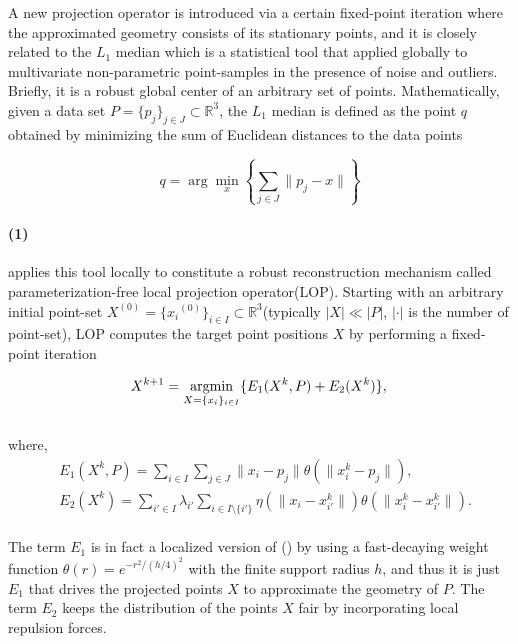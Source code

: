 A new projection operator is introduced via a certain fixed-point iteration where the approximated geometry consists of its stationary points,
and it is closely related to the $L_1$ median\cite{brown1983statistical,small1990survey} which is a statistical tool that applied globally to multivariate non-parametric point-samples in the presence of noise and outliers.
Briefly, it is a robust global center of an arbitrary set of points. Mathematically, given a data set $P=\{p_{j}\}_{j\in J}\subset \mathbb{R}^3$, the $L_1$ median is defined as the point $q$ obtained by minimizing the sum of Euclidean distances to the data points

\small{
\begin{equation}
 \label{eq:L1median}
 q=\arg\min_{x}\left\{ \sum_{j\in J}^{}\|p_{j}-x\| \right\}
\end{equation}
}

\paragraph{(1)}\cite{lipman2007parameterization} applies this tool locally to constitute a robust reconstruction mechanism called parameterization-free local projection operator(LOP). Starting with an arbitrary initial point-set $X^{(0)}=\{{x_{i}}^{(0)}\}_{i\in I}\subset \mathbb{R}^3$(typically $|X|\ll|P|$, $|\cdot|$ is the number of point-set), LOP computes the target point positions $X$ by performing a fixed-point iteration

\small{
\begin{equation}
 \label{eq:LOP1}
 X^{k+1}=\mathop{\operatorname*{argmin}}_{X=\{x_{i}\}_{i\in I}}\{E_1(X^{k},P)+E_2(X^{k})\},\\
\end{equation}
}
\\
where,
\small{
\begin{equation}
 \label{eq:LOP2}
 \begin{split}
 & E_1(X^{k},P)=\sum_{i\in I}^{}\sum_{j\in J}^{}\|x_{i}-p_{j}\|\theta(\|x{_i^k}-p_{j}\|),\\
 & E_2(X^{k})=\sum_{i'\in I}^{}\lambda_{i'}\sum_{i\in I\setminus\{i'\}}^{} \eta(\|x_{i}-x{_{i'}^k}\|)\theta(\|x{_i^k}-x{_{i'}^k}\|).
 \end{split}
\end{equation}
}
\\
The term $E_1$ is in fact a localized version of () by using a fast-decaying weight function $\theta(r)=e^{-r^2/(h/4)^2}$ with the finite support radius $h$,
and thus it is just $E_1$ that drives the projected points $X$ to approximate the geometry of $P$.
The term $E_2$ keeps the distribution of the points $X$ fair by incorporating local repulsion forces.

